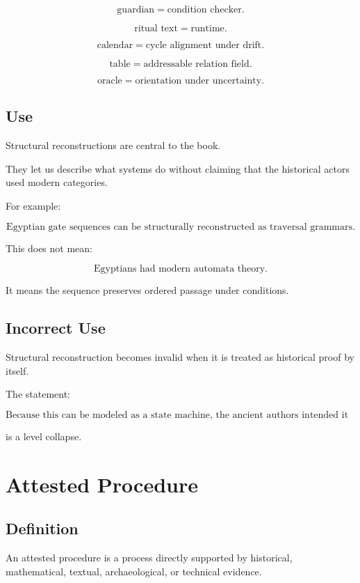 \documentclass[11pt]{book}
\begin{document}
\[
\text{guardian} = \text{condition checker}.
\]

\[
\text{ritual text} = \text{runtime}.
\]

\[
\text{calendar} = \text{cycle alignment under drift}.
\]

\[
\text{table} = \text{addressable relation field}.
\]

\[
\text{oracle} = \text{orientation under uncertainty}.
\]

\subsection{Use}

Structural reconstructions are central to the book.

They let us describe what systems do without claiming that the historical actors used modern categories.

For example:

\[
\text{Egyptian gate sequences can be structurally reconstructed as traversal grammars.}
\]

This does not mean:

\[
\text{Egyptians had modern automata theory.}
\]

It means the sequence preserves ordered passage under conditions.

\subsection{Incorrect Use}

Structural reconstruction becomes invalid when it is treated as historical proof by itself.

The statement:

\[
\text{Because this can be modeled as a state machine, the ancient authors intended it as one.}
\]

is a level collapse.

\section{Attested Procedure}

\subsection{Definition}

An attested procedure is a process directly supported by historical, mathematical, textual, archaeological, or technical evidence.
\end{document}
